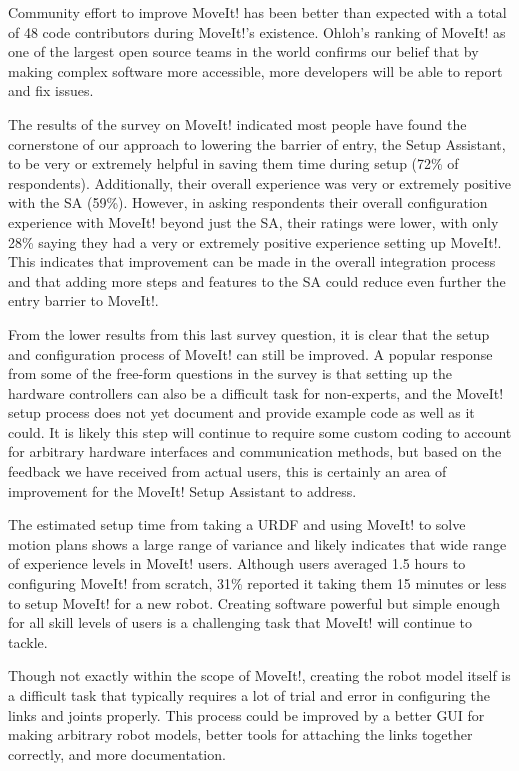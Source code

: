 \documentclass[10pt,journal,compsoc]{joser1}
\begin{document}
{Community effort to improve MoveIt! has been better than expected with a total
of 48 code contributors during MoveIt!'s existence. Ohloh's ranking of MoveIt!
as one of the largest open source teams in the world confirms our belief that by
making complex software more accessible, more developers will be able to report
and fix issues. 

The results of the survey on MoveIt! indicated most people have found the
cornerstone of our approach to lowering the barrier of entry, the Setup
Assistant, to be very or extremely helpful in saving them time during setup
(72\% of respondents). Additionally, their overall experience was very or
extremely positive with the SA (59\%). However, in asking respondents their
overall configuration experience with MoveIt! beyond just the SA, their ratings
were lower, with only 28\% saying they had a very or extremely positive
experience setting up MoveIt!. This indicates that improvement can be made in
the overall integration process and that adding more steps and features to the
SA could reduce even further the entry barrier to MoveIt!. 

From the lower results from this last survey question, it is clear that the
setup and configuration process of MoveIt! can still be improved. A popular
response from some of the free-form questions in the survey is that setting up
the hardware controllers can also be a difficult task for non-experts, and the
MoveIt! setup process does not yet document and provide example code as well as
it could. It is likely this step will continue to require some custom coding to
account for arbitrary hardware interfaces and communication methods, but based
on the feedback we have received from actual users, this is certainly an area of
improvement for the MoveIt! Setup Assistant to address. 

The estimated setup time from taking a URDF and using MoveIt! to solve motion
plans shows a large range of variance and likely indicates that wide range of
experience levels in MoveIt! users. Although users averaged 1.5 hours to
configuring MoveIt! from scratch, 31\% reported it taking them 15 minutes or
less to setup MoveIt! for a new robot. Creating software powerful but simple
enough for all skill levels of users is a challenging task that MoveIt! will
continue to tackle.

Though not exactly within the scope of MoveIt!, creating the robot model itself
is a difficult task that typically requires a lot of trial and error in
configuring the links and joints properly. This process could be improved by a
better GUI for making arbitrary robot models, better tools for attaching the
links together correctly, and more documentation.

}
\end{document}
